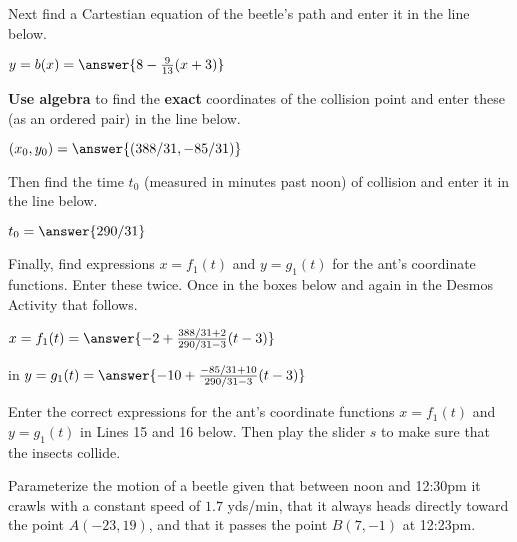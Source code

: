 \documentclass{ximera}
\begin{document}
Next find a Cartestian equation of the beetle's path and enter it in the line below.

\begin{question}  
         $ y=b(x) =  \answer{8-\frac{9}{13}(x+3)}$  
    \end{question}

{\bf Use algebra} to find the {\bf exact} coordinates of the collision point and enter these (as an ordered pair) in the line below.

\begin{question}  
         $ (x_0,y_0) =  \answer{(388/31 , -85/31)}$
    \end{question}

Then find the time $t_0$ (measured in minutes past noon) of collision and enter it in the line below.

\begin{question}  
         $ t_0 =  \answer{290/31}$
    \end{question}

Finally, find expressions $x=f_1(t)$ and $y=g_1(t)$ for the ant's coordinate functions. Enter these twice. Once in the boxes below and again in the Desmos Activity that follows.

\begin{question}  
         $ x = f_1(t) =   \answer{-2+\frac{388/31+2}{290/31-3}(t-3)}$

         in $y=g_1(t) =  \answer{-10+\frac{-85/31+10}{290/31-3}(t-3)}$
    \end{question}


\begin{exploration}\label{exp:pc1c}
Enter the correct expressions for the ant's coordinate functions $x=f_1(t)$ and $y=g_1(t)$ in Lines 15 and 16 below. Then play the slider $s$ to make sure that the insects collide.

 
\begin{onlineOnly}
    \begin{center}
\end{center}
\end{onlineOnly}
\end{exploration}


 Parameterize the motion of a beetle given that between noon and 12:30pm it crawls with a constant speed of $1.7$ yds/min, that it always heads directly toward the point $A(-23,19)$, and that it passes the point $B(7,-1)$ at 12:23pm. 
\end{document}
